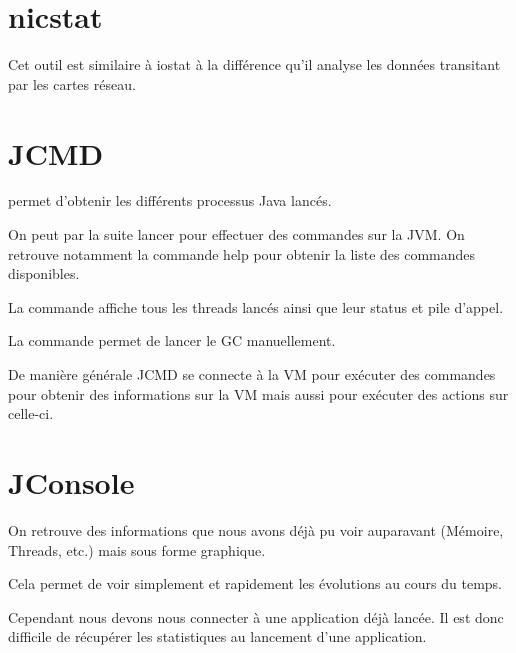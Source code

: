 \documentclass{report}
\begin{document}
		\section{nicstat}
			Cet outil est similaire à iostat à la différence qu'il analyse les données transitant par les cartes réseau.
			
			
		\section{JCMD}
			 permet d'obtenir les différents processus Java lancés.
			
			On peut par la suite lancer  pour effectuer des commandes sur la JVM.
			On retrouve notamment la commande help pour obtenir la liste des commandes disponibles.
			
			La commande  affiche tous les threads lancés ainsi que leur status et pile d'appel.
			
			La commande  permet de lancer le GC manuellement.
			
			De manière générale JCMD se connecte à la VM pour exécuter des commandes pour obtenir des informations sur la VM mais aussi pour exécuter des actions sur celle-ci.
			
		\section{JConsole}
			On retrouve des informations que nous avons déjà pu voir auparavant (Mémoire, Threads, etc.) mais sous forme graphique.
			
			Cela permet de voir simplement et rapidement les évolutions au cours du temps.
			
			\begin{figure}[H]
				\begin{minipage}{0.49\textwidth}
				\end{minipage}
				\begin{minipage}{0.49\textwidth}
				\end{minipage}
			\end{figure}
			
			Cependant nous devons nous connecter à une application déjà lancée.
			Il est donc difficile de récupérer les statistiques au lancement d'une application.
			
\end{document}
